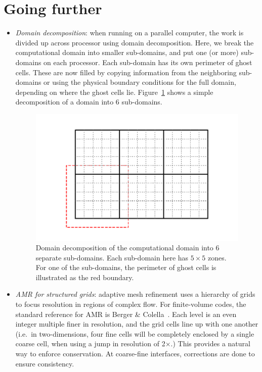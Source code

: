 \section{Going further}

\begin{itemize}

\item {\em Domain decomposition}: when running on a parallel computer,
 the work is divided up across processor using domain decomposition.
 Here, we break the computational domain into smaller sub-domains, and
 put one (or more) sub-domains on each processor.  Each sub-domain
 has its own perimeter of ghost cells.  These are now filled by copying
 information from the neighboring sub-domains or using the physical
 boundary conditions for the full domain, depending on where the
 ghost cells lie.  Figure~\ref{fig:domain} shows a simple decomposition of
 a domain into 6 sub-domains.

 \begin{figure}
 \centering
 \includegraphics[width=\linewidth]{domain}
 \caption[Domain decomposition example] {\label{fig:domain} Domain
   decomposition of the computational domain into 6 separate
   sub-domains.  Each sub-domain here has $5\times 5$ zones.  For one
   of the sub-domains, the perimeter of ghost cells is illustrated as
   the red boundary.}
 \end{figure}

\item {\em AMR for structured grids}: adaptive mesh refinement uses a
  hierarchy of grids to focus resolution in regions of complex flow.
  For finite-volume codes, the standard reference for AMR is Berger \&
  Colella~\cite{berger-colella}.  Each level is an even integer
  multiple finer in resolution, and the grid cells line up with one
  another (i.e.\ in two-dimensions, four fine cells will be completely
  enclosed by a single coarse cell, when using a jump in resolution of
  2$\times$.)  This provides a natural way to enforce conservation.
  At coarse-fine interfaces, corrections are done to ensure
  consistency.


\end{itemize}
